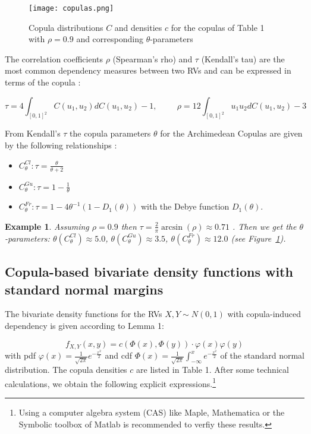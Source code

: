 \documentclass[a4paper]{article}
\begin{document}
\begin{figure}[h]
	\texttt{[image: copulas.png]}  %
	\caption{\small Copula distributions $C$ and densities $c$ for the copulas of Table 1 with $\rho=0.9$ and corresponding $\theta$-parameters}
	\label{fig:copulas}       
\end{figure}

The correlation coefficients $\rho$ (Spearman's rho) and  $\tau$ (Kendall's tau) are the most common dependency measures between two RVs and can be expressed in terms of the copula \cite{CZ19}:

\begin{displaymath}
 \tau=4\int_{[0,1]^2}C(u_1,u_2)dC(u_1,u_2)-1,  \hspace{1cm} \rho=12\int_{[0,1]^2}u_1u_2dC(u_1,u_2)-3
\end{displaymath}

From Kendall's $\tau$ the copula parameters $\theta$ for the Archimedean Copulas are given by the following relationships \cite{MFE05}:

\begin{itemize}
\item $C_\theta^{Cl}: \tau=\frac{\theta}{\theta+2}$
\item $C_\theta^{Gu}: \tau=1-\frac{1}{\theta}$
\item $C_\theta^{Fr}: \tau=1-4\theta^{-1}(1-D_1(\theta))$ with the Debye function $D_1(\theta)$.
\end{itemize}

\newtheorem{example}{Example}
\begin{example}
Assuming $\rho = 0.9$ then $\tau=\frac{2}{\pi} \arcsin(\rho) \approx 0.71$ \cite{CZ19}. Then we get the $\theta$-parameters: $\theta(C_\theta^{Cl}) \approx 5.0$, $\theta(C_\theta^{Gu}) \approx 3.5$, $\theta(C_\theta^{Fr}) \approx 12.0$ (see Figure~\ref{fig:copulas}).
\end{example}

\subsection{Copula-based bivariate density functions with standard normal margins}
The bivariate density functions for the RVs $X, Y \sim N(0,1)$ with copula-induced dependency is given according to Lemma 1:

\begin{equation}
	f_{X,Y}(x,y)=c\left(\Phi(x),\Phi(y)\right)\cdot \varphi(x)\varphi(y)
\end{equation}
with pdf $\varphi(x)=\frac{1}{\sqrt{2\pi}}e^{-\frac{x^2}{2}}$ and cdf $\Phi(x)=\frac{1}{\sqrt{2\pi}} \int_{-\infty}^x e^{-\frac{x^2}{2}}$ of the standard normal distribution. The copula densities $c$ are listed in Table 1. After some technical calculations, we obtain the following explicit expressions.\footnote{\footnotesize{Using a computer algebra system (CAS) like Maple, Mathematica or the Symbolic toolbox of Matlab is recommended to verfiy these results.}} 
\end{document}
